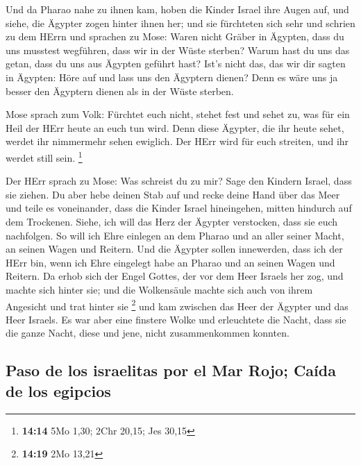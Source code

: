  Und da Pharao nahe zu ihnen kam, hoben die Kinder Israel
ihre Augen auf, und siehe, die Ägypter zogen hinter ihnen her; und sie
fürchteten sich sehr und schrien zu dem HErrn  und
sprachen zu Mose: Waren nicht Gräber in Ägypten, dass du uns musstest
wegführen, dass wir in der Wüste sterben? Warum hast du uns das getan,
dass du uns aus Ägypten geführt hast?  Ist's nicht das,
das wir dir sagten in Ägypten: Höre auf und lass uns den Ägyptern
dienen? Denn es wäre uns ja besser den Ägyptern dienen als in der Wüste
sterben.

 Mose sprach zum Volk: Fürchtet euch nicht, stehet fest
und sehet zu, was für ein Heil der HErr heute an euch tun wird. Denn
diese Ägypter, die ihr heute sehet, werdet ihr nimmermehr sehen
ewiglich.  Der HErr wird für euch streiten, und ihr
werdet still sein. \footnote{\textbf{14:14} 5Mo 1,30; 2Chr 20,15; Jes
  30,15}

 Der HErr sprach zu Mose: Was schreist du zu mir? Sage
den Kindern Israel, dass sie ziehen.  Du aber hebe deinen
Stab auf und recke deine Hand über das Meer und teile es voneinander,
dass die Kinder Israel hineingehen, mitten hindurch auf dem Trockenen.
 Siehe, ich will das Herz der Ägypter verstocken, dass
sie euch nachfolgen. So will ich Ehre einlegen an dem Pharao und an
aller seiner Macht, an seinen Wagen und Reitern.  Und die
Ägypter sollen innewerden, dass ich der HErr bin, wenn ich Ehre
eingelegt habe an Pharao und an seinen Wagen und Reitern.
 Da erhob sich der Engel Gottes, der vor dem Heer Israels
her zog, und machte sich hinter sie; und die Wolkensäule machte sich
auch von ihrem Angesicht und trat hinter sie \footnote{\textbf{14:19}
  2Mo 13,21}  und kam zwischen das Heer der Ägypter und
das Heer Israels. Es war aber eine finstere Wolke und erleuchtete die
Nacht, dass sie die ganze Nacht, diese und jene, nicht zusammenkommen
konnten.

\hypertarget{paso-de-los-israelitas-por-el-mar-rojo-cauxedda-de-los-egipcios}{%
\subsection{Paso de los israelitas por el Mar Rojo; Caída de los
egipcios}\label{paso-de-los-israelitas-por-el-mar-rojo-cauxedda-de-los-egipcios}}

